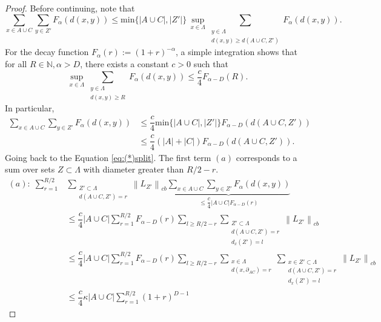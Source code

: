 \documentclass[11pt]{article}
\numberwithin{equation}{section}
\numberwithin{figure}{section}
\numberwithin{table}{section}
\theoremstyle{definition}
\theoremstyle{plain}
\theoremstyle{remark}
\newcommand{\La}{\Lambda}
\newcommand{\normm}[2]{\left\lVert#1\right\rVert_{#2}}
\newcommand{\abs}[1]{\left \vert#1\right\vert}
\begin{document}
\begin{proof}
     
     Before continuing, note that
     \begin{equation}
         \sum_{x\in A\cup C}\sum_{y\in Z'}F_\alpha(d(x,y))\leq \text{min}\{\abs{A\cup C},\abs{Z'}\}\,\sup_{x\in \Lambda}\sum\limits_{\substack{y\in \Lambda \\ 
         d(x,y)\geq d(A\cup C,Z')
         }}   
         F_\alpha\left (d(x,y)\right).
     \end{equation}
    For the decay function $F_\alpha (r):=(1+r)^{-\alpha}$, a simple integration shows that for all $R\in \mathbb{N},\alpha > D$, there exists a constant $c > 0$ such that
    \begin{equation}
        \sup_{x\in \Lambda}\sum\limits_{\substack{y\in \Lambda \\ 
         d(x,y)\geq R
         }}   
         F_\alpha\left (d(x,y)\right)\leq \dfrac{c}{4}F_{\alpha-D}(R).
    \end{equation}
    In particular,
    \begin{align}
        \sum_{x\in A\cup C}\sum_{y\in Z'}F_\alpha(d(x,y))& \leq \dfrac{c}{4}\text{min}\{\abs{A\cup C},\abs{Z'}\}F_{\alpha-D}(d(A\cup C,Z')) \\ & \nonumber \leq\dfrac{c}{4}(\abs{A}+\abs{C})F_{\alpha-D}(d(A\cup C,Z')).
    \end{align}
    Going back to the Equation \eqref{eq:(*)split}. The first term $(a)$ corresponds to a sum over sets $Z\subset \La$ with diameter greater than $R/2-r$.
\begin{align}
(a):\;\sum_{r=1}^{R/2}&
\sum_{\substack{Z'\subset \La \\ d(A\cup C,Z')= r}}
\normm{L_{Z'}}{cb}
\underbrace{\sum_{x\in A\cup C}\sum_{y\in Z'}F_\alpha(d(x,y))}_{\le \dfrac{c}{4}\abs{A\cup C}F_{\alpha-D}(r)}
\\
&\le
\dfrac{c}{4}\abs{A\cup C}
\sum_{r=1}^{R/2}
F_{\alpha-D}(r)
\sum_{l\ge R/2-r}
\sum_{\substack{Z'\subset \La \\ d(A\cup C,Z')= r \\ d_x(Z')=l}}
\normm{L_{Z'}}{cb}
\nonumber\\
&\le
\dfrac{c}{4}\abs{A\cup C}
\sum_{r=1}^{R/2}
F_{\alpha-D}(r)
\sum_{l\ge R/2-r}
\sum_{\substack{x\in \La \\ d(x,\partial_{AC})= r}}
\sum_{\substack{x\in Z'\subset \La \\ d(A\cup C,Z')= r \\ d_x(Z')=l}}
\normm{L_{Z'}}{cb}
\nonumber\\
&\le
\dfrac{c}{4}\kappa \abs{A\cup C}
\sum_{r=1}^{R/2}
(1+r)^{D-1}

\end{align}
\end{proof}
\end{document}
